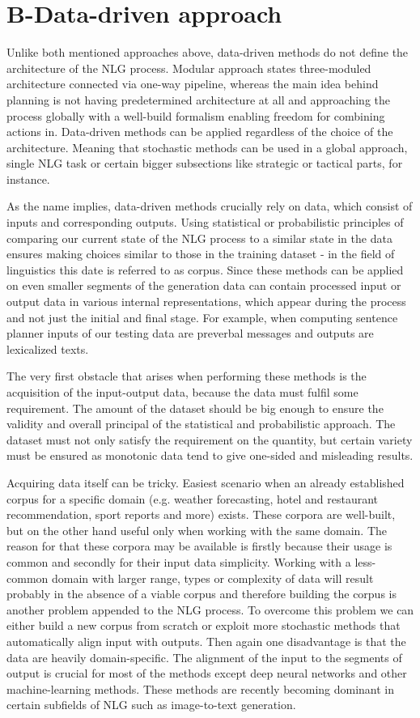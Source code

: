 \section{B-Data-driven approach}
Unlike both mentioned approaches above, data-driven methods do not define the architecture of the NLG process. Modular approach states three-moduled architecture connected via one-way pipeline, whereas the main idea behind planning is not having predetermined architecture at all and approaching the process globally with a well-build formalism enabling freedom for combining actions in. Data-driven methods can be applied regardless of the choice of the architecture. Meaning that stochastic methods can be used in a global approach, single NLG task or certain bigger subsections like strategic or tactical parts, for instance.

As the name implies, data-driven methods crucially rely on data, which consist of inputs and corresponding outputs. Using statistical or probabilistic principles of comparing our current state of the NLG process to a similar state in the data ensures making choices similar to those in the training dataset - in the field of linguistics this date is referred to as corpus. Since these methods can be applied on even smaller segments of the generation data can contain processed input or output data in various internal representations, which appear during the process and not just the initial and final stage. For example, when computing sentence planner inputs of our testing data are preverbal messages and outputs are lexicalized texts.

The very first obstacle that arises when performing these methods is the acquisition of the input-output data, because the data must fulfil some requirement. The amount of the dataset should be big enough to ensure the validity and overall principal of the statistical and probabilistic approach. The dataset must not only satisfy the requirement on the quantity, but certain variety must be ensured as monotonic data tend to give one-sided and misleading results. 

Acquiring data itself can be tricky. Easiest scenario when an already established corpus for a specific domain (e.g. weather forecasting, hotel and restaurant recommendation, sport reports and more) exists. These corpora are well-built, but on the other hand useful only when working with the same domain. The reason for that these corpora may be available is firstly because their usage is common and secondly for their input data simplicity. Working with a less-common domain with larger range, types or complexity of data will result probably in the absence of a viable corpus and therefore building the corpus is another problem appended to the NLG process. To overcome this problem we can either build a new corpus from scratch or exploit more stochastic methods that automatically align input with outputs. Then again one disadvantage is that the data are heavily domain-specific. The alignment of the input to the segments of output is crucial for most of the methods except deep neural networks and other machine-learning methods. These methods are recently becoming dominant in certain subfields of NLG such as image-to-text generation.

